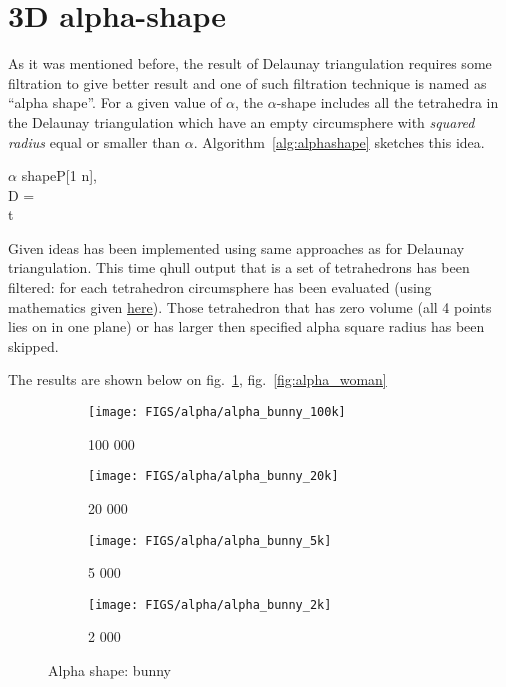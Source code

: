 \documentclass[11pt]{article}
\begin{document}
\section{3D alpha-shape}
As it was mentioned before, the result of Delaunay triangulation requires some filtration to give better result and one of such filtration technique is named as “alpha shape”.
For a given value of $\alpha$, 
the $\alpha$-shape includes all the tetrahedra in the Delaunay triangulation which have an empty circumsphere with {\em squared radius} equal or smaller than $\alpha$.
Algorithm~\ref{alg:alphashape} sketches this idea.

{\small
	\begin{pseudocode}[shadowbox]{$\alpha$ shape}{P[1 \cdots n], \alpha}
	\label{alg:alphashape}
	\\
	D =  \\
	 \DO
	\BEGIN
	\IF {}  \DO
		 t
	\END
	\end{pseudocode}
}

Given ideas has been implemented using same approaches as for Delaunay triangulation. This time qhull output that is a set of tetrahedrons has been filtered: for each tetrahedron circumsphere has been evaluated (using mathematics given \href{http://www.ambrsoft.com/TrigoCalc/Sphere/Spher3D_.htm}{here}). Those tetrahedron that has zero volume (all 4 points lies on in one plane) or has larger then specified alpha square radius has been skipped.

The results are shown below on fig.~\ref{fig:alpha_bunny}, fig.~\ref{fig:alpha_woman} 
\begin{figure}[h]
    \begin{subfigure}{.22\textwidth}
        \centering
        \texttt{[image: FIGS/alpha/alpha\_bunny\_100k]}
        \caption{100 000}
    \end{subfigure}
    \begin{subfigure}{.22\textwidth}
        \centering
        \texttt{[image: FIGS/alpha/alpha\_bunny\_20k]}
        \caption{20 000}
    \end{subfigure}
    \begin{subfigure}{.22\textwidth}
        \centering
        \texttt{[image: FIGS/alpha/alpha\_bunny\_5k]}
        \caption{5 000}
    \end{subfigure}
    \begin{subfigure}{.22\textwidth}
        \centering
        \texttt{[image: FIGS/alpha/alpha\_bunny\_2k]}
        \caption{2 000}
    \end{subfigure}
    \caption{Alpha shape: bunny}
    \label{fig:alpha_bunny}
\end{figure}
\end{document}
